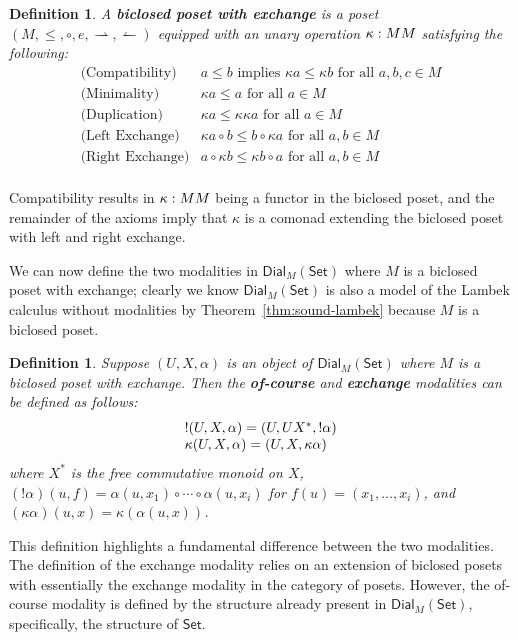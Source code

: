 \documentclass{article}
\let\to\relax                   %
\newcommand{\to}{\rightarrow}
\newcommand{\rto}{\leftharpoonup}
\newcommand{\lto}{\rightharpoonup}
\newcommand{\Set}{\mathsf{Set}}
\newcommand{\Dial}[2]{\mathsf{Dial}_{#1}(#2)}
\newtheorem{definition}[theorem]{Definition}
\begin{document}
\begin{definition}
  \label{def:biclosed-exchange}
  A \textbf{biclosed poset with exchange} is a poset $(M, \leq, \circ,
  e, \lto, \rto)$ equipped with an unary operation $\kappa : M \to M$
  satisfying the following:
  \[
  \begin{array}{clr}
    \text{(Compatibility)} & a \leq b \text{ implies } \kappa a \leq \kappa b \text{ for all } a,b,c \in M\\
    \text{(Minimality)} & \kappa a \leq a \text{ for all } a \in M\\
    \text{(Duplication)} & \kappa a \leq \kappa\kappa a \text{ for all } a \in M\\
    \text{(Left Exchange)} & \kappa a \circ b \leq b \circ \kappa a \text{ for all } a, b \in M\\
    \text{(Right Exchange)} & a \circ \kappa b \leq \kappa b \circ a \text{ for all } a, b \in M\\
  \end{array}
  \]
\end{definition}
\noindent
Compatibility results in $\kappa : M \to M$ being a functor in the
biclosed poset, and the remainder of the axioms imply that $\kappa$ is
a comonad extending the biclosed poset with left and right exchange.

We can now define the two modalities in $\Dial{M}{\Set}$ where $M$ is
a biclosed poset with exchange; clearly we know $\Dial{M}{\Set}$ is
also a model of the Lambek calculus without modalities by
Theorem~\ref{thm:sound-lambek} because $M$ is a biclosed poset.
\begin{definition}
  \label{def:modalities-dial}
  Suppose $(U, X, \alpha)$ is an object of $\Dial{M}{\Set}$ where $M$
  is a biclosed poset with exchange. Then the \textbf{of-course} and
  \textbf{exchange} modalities can be defined as follows:
  \[
  \begin{array}{lll}
    ! (U, X, \alpha) = (U, U \to X^*, !\alpha)\\
    \kappa (U, X, \alpha) = (U, X, \kappa \alpha)\\
  \end{array}
  \]
  where $X^*$ is the free commutative monoid on $X$, $(!\alpha)(u, f)
  = \alpha(u, x_1) \circ \cdots \circ \alpha(u, x_i)$ for $f(u) =
  (x_1, \ldots, x_i)$, and $(\kappa \alpha)(u, x) = \kappa (\alpha(u,
  x))$.
\end{definition}
This definition highlights a fundamental difference between the two
modalities.  The definition of the exchange modality relies on an
extension of biclosed posets with essentially the exchange modality in
the category of posets.  However, the of-course modality is defined by
the structure already present in $\Dial{M}{\Set}$, specifically, the
structure of $\Set$.
\end{document}
